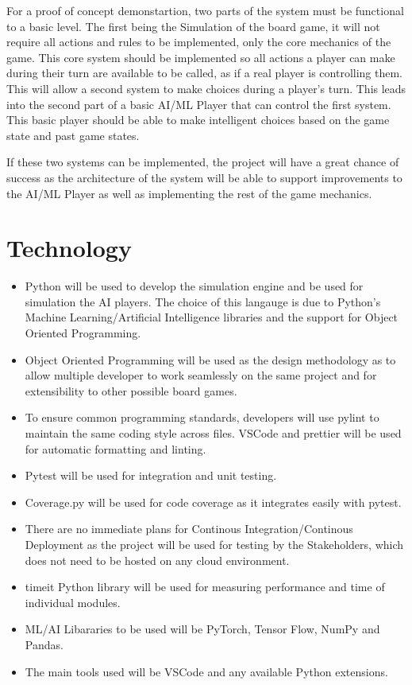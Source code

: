 \documentclass{article}
\begin{document}
For a proof of concept demonstartion, two parts of the system must be functional to a basic level.
The first being the Simulation of the board game, it will not require all actions and rules to be implemented, only
the core mechanics of the game. This core system should be implemented so all actions a player can make during their turn
are available to be called, as if a real player is controlling them. This will allow a second system to make choices during 
a player's turn. This leads into the second part of a basic AI/ML Player that can control the first system. This basic player should
be able to make intelligent choices based on the game state and past game states. 

If these two systems can be implemented, the project will have a great chance of success as the architecture of the system will
be able to support improvements to the AI/ML Player as well as implementing the rest of the game mechanics.

\section{Technology}

\begin{itemize}
\item Python will be used to develop the simulation engine and be used for simulation the AI players. 
The choice of this langauge is due to Python's Machine Learning/Artificial Intelligence libraries and the support for
 Object Oriented Programming.
\item Object Oriented Programming will be used as the design methodology as to allow multiple developer to work seamlessly 
on the same project and for extensibility to other possible board games. 
\item To ensure common programming standards, developers will use pylint to maintain the same coding style across files. 
VSCode and prettier will be used for automatic formatting and linting.
\item Pytest will be used for integration and unit testing.
\item Coverage.py will be used for code coverage as it integrates easily with pytest.
\item There are no immediate plans for Continous Integration/Continous Deployment as the project will be used for testing by the 
Stakeholders, which does not need to be hosted on any cloud environment.
\item timeit Python library will be used for measuring performance and time of individual modules.
\item ML/AI Libararies to be used will be PyTorch, Tensor Flow, NumPy and Pandas.
\item The main tools used will be VSCode and any available Python extensions.
\end{itemize}
\end{document}
